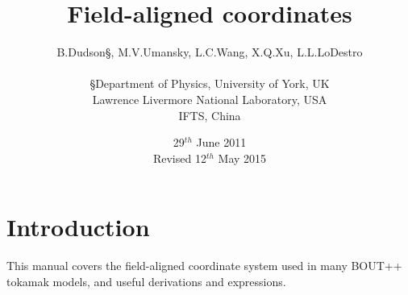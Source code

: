 \documentclass[12pt]{article}
\begin{document}
\title{Field-aligned coordinates}
\author{B.Dudson\S, M.V.Umansky\dag, L.C.Wang\ddag, X.Q.Xu\dag,
L.L.LoDestro\dag \\
\\
  \S Department of Physics, University of York, UK \\
  \dag Lawrence Livermore National Laboratory, USA \\
  \ddag IFTS, China}
\date{29$^{th}$ June 2011\\Revised 12$^{th}$ May 2015}
\maketitle

\tableofcontents



\section{Introduction}
This manual covers the field-aligned coordinate system used in many BOUT++
tokamak models, and useful derivations and expressions.
\end{document}
